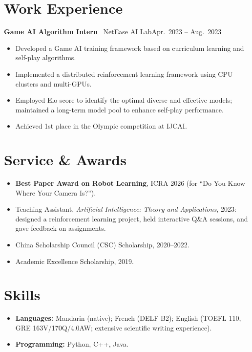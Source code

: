 \documentclass[10pt,letterpaper]{article}
\newcommand{\daterow}[2]{\noindent#1\hfill#2\par}
\begin{document}
\section{Work Experience}
\daterow{\textbf{Game AI Algorithm Intern} \textbullet\ NetEase AI Lab}{Apr.\ 2023 -- Aug.\ 2023}
\vspace{1pt}
\begin{itemize}
  \item Developed a Game AI training framework based on curriculum learning and self-play algorithms.
  \item Implemented a distributed reinforcement learning framework using CPU clusters and multi-GPUs.
  \item Employed Elo score to identify the optimal diverse and effective models; maintained a long-term model pool to enhance self-play performance.
  \item Achieved 1st place in the Olympic competition at IJCAI.
\end{itemize}

\section{Service \& Awards}
\begin{itemize}
  \item \textbf{Best Paper Award on Robot Learning}, ICRA 2026 (for ``Do You Know Where Your Camera Is?'').
  \item Teaching Assistant, \textit{Artificial Intelligence: Theory and Applications}, 2023: designed a reinforcement learning project, held interactive Q\&A sessions, and gave feedback on assignments.
  \item China Scholarship Council (CSC) Scholarship, 2020--2022.
  \item Academic Excellence Scholarship, 2019.
\end{itemize}

\section{Skills}
\begin{itemize}
  \item \textbf{Languages:} Mandarin (native); French (DELF B2); English (TOEFL 110, GRE 163V/170Q/4.0AW; extensive scientific writing experience).
  \item \textbf{Programming:} Python, C++, Java.
\end{itemize}
\end{document}
